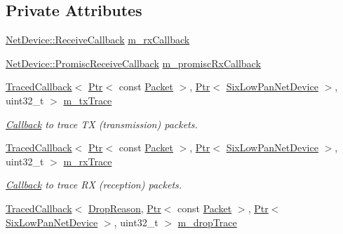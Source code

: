 \subsection*{Private Attributes}
\begin{DoxyCompactItemize}
\item 
\hyperlink{classns3_1_1NetDevice_ad5e5e1ca187472bc2ba99575d8def568}{Net\+Device\+::\+Receive\+Callback} \hyperlink{classns3_1_1SixLowPanNetDevice_ae6028c6ebba2eac40772788104cb57ea}{m\+\_\+rx\+Callback}
\item 
\hyperlink{classns3_1_1NetDevice_a427225795919f26c414bee2ea3f31ed2}{Net\+Device\+::\+Promisc\+Receive\+Callback} \hyperlink{classns3_1_1SixLowPanNetDevice_add2ead5d1d3c4a9b22bc8d01e0c04d83}{m\+\_\+promisc\+Rx\+Callback}
\item 
\hyperlink{classns3_1_1TracedCallback}{Traced\+Callback}$<$ \hyperlink{classns3_1_1Ptr}{Ptr}$<$ const \hyperlink{classns3_1_1Packet}{Packet} $>$, \hyperlink{classns3_1_1Ptr}{Ptr}$<$ \hyperlink{classns3_1_1SixLowPanNetDevice}{Six\+Low\+Pan\+Net\+Device} $>$, uint32\+\_\+t $>$ \hyperlink{classns3_1_1SixLowPanNetDevice_a6d80896d0b58fd8a5577c65a060ad3b1}{m\+\_\+tx\+Trace}
\begin{DoxyCompactList}\small\item\em \hyperlink{classns3_1_1Callback}{Callback} to trace TX (transmission) packets. \end{DoxyCompactList}\item 
\hyperlink{classns3_1_1TracedCallback}{Traced\+Callback}$<$ \hyperlink{classns3_1_1Ptr}{Ptr}$<$ const \hyperlink{classns3_1_1Packet}{Packet} $>$, \hyperlink{classns3_1_1Ptr}{Ptr}$<$ \hyperlink{classns3_1_1SixLowPanNetDevice}{Six\+Low\+Pan\+Net\+Device} $>$, uint32\+\_\+t $>$ \hyperlink{classns3_1_1SixLowPanNetDevice_a868eb6580b5eced376dadafa67aeda6b}{m\+\_\+rx\+Trace}
\begin{DoxyCompactList}\small\item\em \hyperlink{classns3_1_1Callback}{Callback} to trace RX (reception) packets. \end{DoxyCompactList}\item 
\hyperlink{classns3_1_1TracedCallback}{Traced\+Callback}$<$ \hyperlink{classns3_1_1SixLowPanNetDevice_a70cec96e849d8504419dab1efd94fc05}{Drop\+Reason}, \hyperlink{classns3_1_1Ptr}{Ptr}$<$ const \hyperlink{classns3_1_1Packet}{Packet} $>$, \hyperlink{classns3_1_1Ptr}{Ptr}$<$ \hyperlink{classns3_1_1SixLowPanNetDevice}{Six\+Low\+Pan\+Net\+Device} $>$, uint32\+\_\+t $>$ \hyperlink{classns3_1_1SixLowPanNetDevice_a93e0ef7a17057bcb8420b8d37ec56356}{m\+\_\+drop\+Trace}

\end{DoxyCompactItemize}
